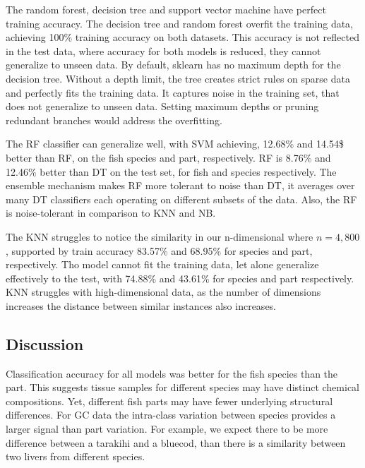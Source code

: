 \documentclass[runningheads]{llncs}
\begin{document}

The random forest, decision tree and support vector machine have perfect training accuracy.
The decision tree and random forest overfit the training data, achieving 100\% training accuracy on both datasets.
This accuracy is not reflected in the test data, where accuracy for both models is reduced, they cannot generalize to unseen data. 
By default, sklearn has no maximum depth for the decision tree.
Without a depth limit, the tree creates strict rules on sparse data and perfectly fits the training data.
It captures noise in the training set, that does not generalize to unseen data. 
Setting maximum depths or pruning redundant branches would address the overfitting. 

The RF classifier can generalize well, with SVM achieving, 12.68\% and 14.54\$ better than RF, on the fish species and part, respectively.
RF is 8.76\% and 12.46\% better than DT on the test set, for fish and species respectively. 
The ensemble mechanism makes RF more tolerant to noise than DT, it averages over many DT classifiers each operating on different subsets of the data. 
Also, the RF is noise-tolerant in comparison to KNN and NB.

The KNN struggles to notice the similarity in our n-dimensional where $n=4,800$, supported by train accuracy 83.57\% and 68.95\% for species and part, respectively. Tho model cannot fit the training data, let alone generalize effectively to the test, with 74.88\% and 43.61\% for species and part respectively. 
KNN struggles with high-dimensional data, as the number of dimensions increases the distance between similar instances also increases. 

\subsection{Discussion}
\label{sec:results-classification-discussion}

Classification accuracy for all models was better for the fish species than the part.
This suggests tissue samples for different species may have distinct chemical compositions.
Yet, different fish parts may have fewer underlying structural differences.
For GC data the intra-class variation between species provides a larger signal than part variation.
For example, we expect there to be more difference between a tarakihi and a bluecod, than there is a similarity between two livers from different species.
\end{document}

